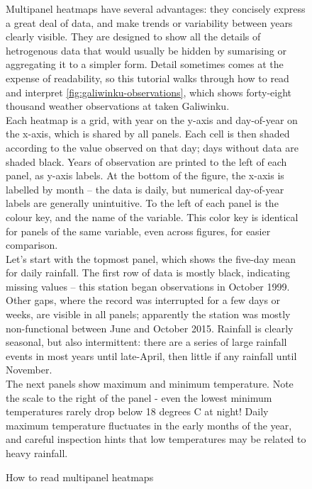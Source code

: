 \begin{figure}[p]
\begin{framed}
\caption[How to read multipanel heatmaps]{How to read multipanel heatmaps}
\label{fig:how-read-multipanel}
    Multipanel heatmaps have several advantages: they concisely express a
    great deal of data, and make trends or variability between years clearly
    visible.  They are designed to show all the details of hetrogenous data
    that would usually be hidden by sumarising or aggregating it to a simpler
    form.  Detail sometimes comes at the expense of readability, so this tutorial
    walks through how to read and interpret \cref{fig:galiwinku-observations},
    which shows forty-eight thousand weather observations at taken Galiwinku.\\

    Each heatmap is a grid, with year on the y-axis and day-of-year on the
    x-axis, which is shared by all panels.  Each cell is then shaded according
    to the value observed on that day; days  without data are shaded black.
    Years of observation are printed to the left of each panel, as y-axis labels.
    At the bottom of the figure, the x-axis is labelled by month -- the data
    is daily, but numerical day-of-year labels are generally unintuitive.
    To the left of each panel is the colour key, and the name of the variable.
    This color key is identical for panels of the same variable, even across
    figures, for easier comparison.\\

    Let's start with the topmost panel, which shows the five-day mean for
    daily rainfall.  The first row of data is mostly black, indicating missing
    values -- this station began observations in October 1999.  Other gaps,
    where the record was interrupted for a few days or weeks, are visible in
    all panels; apparently the station was mostly non-functional between June
    and October 2015.
    Rainfall is clearly seasonal, but also intermittent:  there are a series
    of large rainfall events in most years until late-April, then little if any
    rainfall until November.\\

    The next panels show maximum and minimum temperature.  Note the scale to
    the right of the panel - even the lowest minimum temperatures rarely drop
    below 18 degrees C at night!  Daily maximum temperature fluctuates in the
    early months of the year, and careful inspection hints that low temperatures
    may be related to heavy rainfall.\\


\end{framed}
\end{figure}
